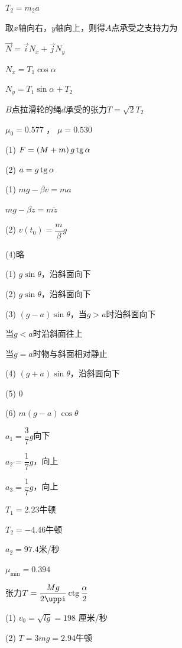 $ T _ { 2 } = m _ { 2 } a   $

取$ x $轴向右，$ y $轴向上，则得$ A $点承受之支持力为

$ \vec{N} = \vec{i} N _ { x } + \vec{j} N _ { y }  $

$ N _ { x } = T _ { 1 } \cos \alpha   $

$ N _ { y } = T _ { 1 } \sin \alpha + T _ { 2 }  $

$ B $点拉滑轮的绳$ d $承受的张力$  T = \sqrt { 2 } T _ { 2 }  $

\answer $ \mu _ { 0 } = 0 . 5 7 7$ ， $\mu = 0 . 5 3 0   $

\answer (1) $ F = \left( M + m \right) g \operatorname{tg} \alpha $

(2) $ a = g \operatorname{tg} \alpha  $

\answer (1) $ m g - \beta v = m a $

\aindent $ m g - \beta \dot{z} = m \ddot{z}  $

(2) $ v \left( t _ { 0 } \right) = \dfrac { m } { \beta } g $

(4)略

\answer (1) $ g \sin \theta $，沿斜面向下

(2) $ g \sin \theta $，沿斜面向下

(3) $ \left( g - a \right) \sin \theta   $，当$  g > a   $时沿斜面向下

\aindent 当$  g < a   $时沿斜面往上

\aindent 当$  g = a   $时物与斜面相对静止

(4) $ \left( g + a \right) \sin \theta   $，沿斜面向下

(5) 0

(6) $ m \left( g - a \right) \cos \theta $

\answer $ a _ { 1 } = \dfrac { 3 } { 7 } g $向下

$ a _ { 2 } = \dfrac { 1 } { 7 } g$，向上

$ a _ { 3 } = \dfrac { 1 } { 7 } g $，向上

$ T _ { 1 } = 2 . 2 3   $牛顿

$ T _ { 2 } = - 4 . 4 6   $牛顿

\answer $ a _ { 2 } = 97.4 $米/秒

\answer $ \mu _ { \text{min} } = 0 . 3 9 4  $

\answer 张力$ T = \dfrac { M g } { 2 \uppi } \ctg \dfrac { \alpha } { 2 }  $

\answer (1) $ v _ { 0 } = \sqrt { l g } = 1 9 8  $ 厘米/秒

(2) $ T = 3 m g = 2 . 9 4$牛顿

